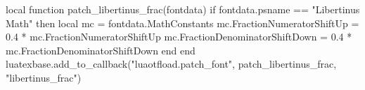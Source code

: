     \begin{luacode*}
    local function patch_libertinus_frac(fontdata)
    if fontdata.psname == "Libertinus Math" then
        local mc = fontdata.MathConstants
        mc.FractionNumeratorShiftUp = 0.4 * mc.FractionNumeratorShiftUp
        mc.FractionDenominatorShiftDown = 0.4 * mc.FractionDenominatorShiftDown
        end
    end
    luatexbase.add_to_callback("luaotfload.patch_font", patch_libertinus_frac, "libertinus_frac")
    \end{luacode*}
\fi
%
%
%
%
        {%
        \setdefaultlanguage{french}%
        \def\og{<<\,}\def\fg{\,>>}%
        \gappto{}%
        }{}%
%
%
%
%
\ifluatex

